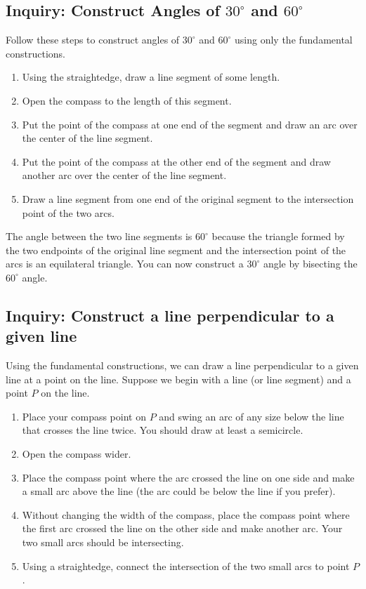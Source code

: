 \documentclass[11pt]{article}
\newenvironment{task}
	{\begin{mdframed}[linecolor=lightgray, linewidth=3pt]\raggedright}
	{\end{mdframed}}
\theoremstyle{definition}
\begin{document}
\subsection{Inquiry: Construct Angles of $30^\circ$ and $60^\circ$}
\begin{task}

Follow these steps to construct angles of $30^\circ$ and $60^\circ$ using only the fundamental constructions.
\begin{enumerate}
  \item Using the straightedge, draw a line segment of some length.
  \item Open the compass to the length of this segment.
  \item Put the point of the compass at one end of the segment and draw an arc over the center of the line segment.
  \item Put the point of the compass at the other end of the segment and draw another arc over the center of the line segment.
  \item Draw a line segment from one end of the original segment to the intersection point of the two arcs.
\end{enumerate}

The angle between the two line segments is $60^\circ$ because the triangle formed by the two endpoints of the original line segment and the
intersection point of the arcs is an equilateral triangle. You can now construct a $30^\circ$ angle by bisecting the $60^\circ$ angle.
\end{task}

\subsection{Inquiry: Construct a line perpendicular to a given line}
\begin{task}
  Using the fundamental constructions, we can draw a line perpendicular to a given line at a point on the line. Suppose we begin with a
  line (or line segment) and a point $P$ on the line.

  \begin{enumerate}
    \item Place your compass point on $P$ and swing an arc of any size below the line that crosses the line twice. You should draw at least a semicircle. 
    \item Open the compass wider.
    \item Place the compass point where the arc crossed the line on one side and make a small arc above the line (the arc could be below the line if you prefer).
    \item Without changing the width of the compass, place the compass point where the first arc crossed the line on the other side and make another arc. 
      Your two small arcs should be intersecting.
    \item Using a straightedge, connect the intersection of the two small arcs to point $P$.
  \end{enumerate}
\end{task}
\end{document}
